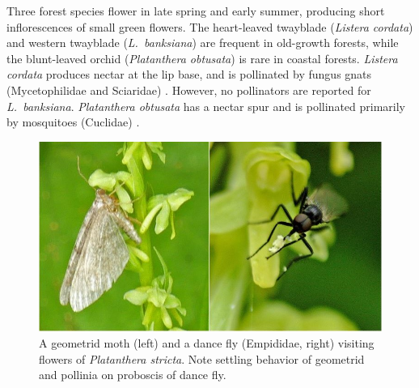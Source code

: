 \begin{multicols}{2}
Three forest species flower in late spring and early summer, producing
short inflorescences of small green flowers. The heart-leaved twayblade
(\emph{Listera cordata}) and western twayblade (\emph{L.\ banksiana}) are
frequent in old-growth forests, while the blunt-leaved orchid
(\emph{Platanthera obtusata}) is rare in coastal forests. \emph{Listera
cordata} produces nectar at the lip base, and is pollinated by fungus
gnats (Mycetophilidae and Sciaridae) \citep{AckermanMesler1979}.
However, no pollinators are reported for \emph{L.\ banksiana}. \emph{Platanthera
obtusata} has a nectar spur and is pollinated primarily by mosquitoes
(Cuclidae) \citep{Gorham1976}.

\begin{figure}[H]
\begin{center}
\vspace{2mm}
\includegraphics[width=\textwidth]{img/moth_empidid.jpg}
\caption{A geometrid moth (left) and a dance fly (Empididae, right) visiting flowers of \emph{Platanthera stricta}.  Note settling behavior of geometrid and pollinia on proboscis of dance fly.}
\label{moth_empidid}
\end{center}
\end{figure}


\end{multicols}
